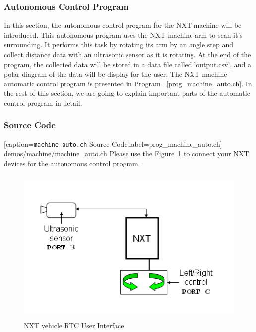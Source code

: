 \documentclass[11pt]{article}
\begin{document}
\subsubsection{Autonomous Control Program}
In this section, the autonomous control program for the NXT machine will be introduced.
This autonomous program uses the NXT machine arm to scan it's surrounding. It performs 
this task by rotating its arm by an angle step and collect distance data with an 
ultrasonic sensor as it is rotating. At the end of the program, the collected data will be 
stored in a data file called 'output.csv', and a polar diagram of the data will be display 
for the user. The NXT machine automatic control program is presented in Program~
\ref{prog_machine_auto.ch}. In the rest of this section, we are going to explain important 
parts of the automatic control program in detail.

\subsubsection*{Source Code}

[caption={{\tt machine\_auto.ch} Source Code},label=prog_machine_auto.ch]
{demos/machine/machine_auto.ch}
Please use the Figure~\ref{fig_NXT_machauto_port} to connect your NXT devices for the 
autonomous control program.
\begin{figure}[h!]
    \begin{center}
    \includegraphics[height=3in]{figure/mindstorm/NXT_machauto_port.png}
    \caption{NXT vehicle RTC User Interface \label{fig_NXT_machauto_port}}
\end{center}
\end{figure}
\end{document}
